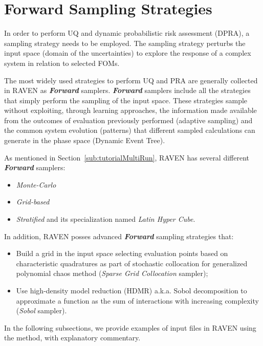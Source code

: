 \section{Forward Sampling Strategies}
\label{sec:forwardSamplingStrategies}
In order to perform UQ and dynamic
probabilistic risk assessment (DPRA),
a sampling strategy needs to be employed. The sampling strategy
perturbs the input space (domain of the uncertainties) to explore
the response of a complex system in relation to selected FOMs.

The most widely used strategies to perform UQ and PRA are generally
collected in RAVEN as \textit{\textbf{Forward}} samplers. \textit{\textbf{Forward}} samplers include
all the strategies that simply perform the sampling of the input space.  These strategies sample
without exploiting, through learning approaches,
the information made available from the outcomes of evaluation previously performed (adaptive sampling) and the
common system evolution (patterns) that different sampled calculations can generate in the phase space (Dynamic Event Tree).

As mentioned in Section~\ref{sub:tutorialMultiRun}, RAVEN has
several different \textit{\textbf{Forward}} samplers:
\begin{itemize}
  \item \textit{Monte-Carlo}
  \item \textit{Grid-based}
  \item \textit{Stratified} and its specialization named \textit{Latin Hyper Cube}.
\end{itemize}
In addition, RAVEN posses advanced \textit{\textbf{Forward}} sampling strategies that:
\begin{itemize}
  \item Build a grid in the input space selecting evaluation points
    based on characteristic quadratures as part of stochastic collocation
    for generalized polynomial chaos method (\textit{Sparse
    Grid Collocation} sampler);
  \item Use high-density model reduction (HDMR) a.k.a. Sobol
    decomposition to approximate a function as the sum of
    interactions with increasing complexity (\textit{Sobol} sampler).
\end{itemize}
In the following subsections, we provide examples of input files
in RAVEN using the method, with explanatory commentary.
